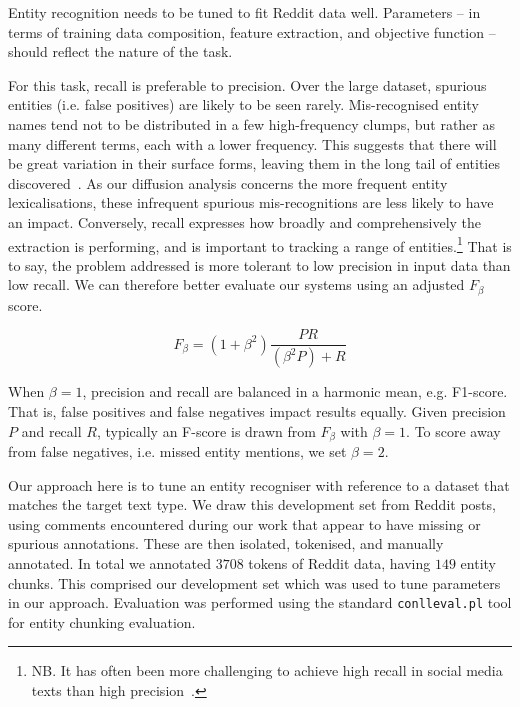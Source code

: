 \documentclass[sigconf]{acmart}
\begin{document}
Entity recognition needs to be tuned to fit Reddit data well.
Parameters -- in terms of training data composition, feature extraction, and objective function -- should reflect the nature of the task.

For this task, recall is preferable to precision.
Over the large dataset, spurious entities (i.e. false positives) are likely to be seen rarely.
Mis-recognised entity names tend not to be distributed in a few high-frequency clumps, but rather as many different terms, each with a lower frequency.
This suggests that there will be great variation in their surface forms, leaving them in the long tail of entities discovered~\cite{leginus2015enhanced}.
As our diffusion analysis concerns the more frequent entity lexicalisations, these infrequent spurious mis-recognitions are less likely to have an impact.
Conversely, recall expresses how broadly and comprehensively the extraction is performing, and is important to tracking a range of entities.\footnote{NB. It has often been more challenging to achieve high recall in social media texts than high precision~\cite{ritter2011named,derczynski2015analysis}.}
That is to say, the problem addressed is more tolerant to low precision in input data than low recall.
We can therefore better evaluate our systems using an adjusted $F_\beta$ score.

\begin{equation}
F_\beta = (1+\beta^2)\frac{PR}{(\beta^2 P) + R} 
\end{equation}

When $\beta=1$, precision and recall are balanced in a harmonic mean, e.g. F1-score.
That is, false positives and false negatives impact results equally.
Given precision $P$ and recall $R$, typically an F-score is drawn from $F_\beta$ with $\beta=1$.
To score away from false negatives, i.e. missed entity mentions, we set $\beta=2$.

Our approach here is to tune an entity recogniser with reference to a dataset that matches the target text type.
We draw this development set from Reddit posts, using comments encountered during our work that appear to have missing or spurious annotations.
These are then isolated, tokenised, and manually annotated.
In total we annotated $3 708$ tokens of Reddit data, having $149$ entity chunks.
This comprised our development set which was used to tune parameters in our approach.
Evaluation was performed using the standard {\tt \small conlleval.pl} tool for entity chunking evaluation.
\end{document}
